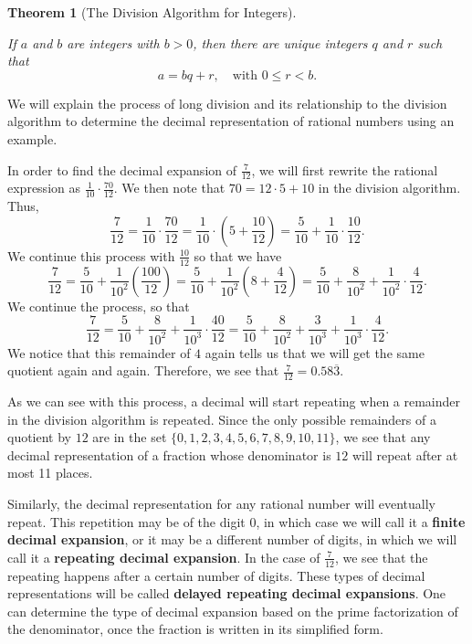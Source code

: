 \documentclass[
]{book}
\newtheorem{theorem}{Theorem}[chapter]
\theoremstyle{definition}
\theoremstyle{definition}
\theoremstyle{definition}
\theoremstyle{definition}
\theoremstyle{remark}
\begin{document}
\begin{theorem}[The Division Algorithm for Integers]
\protect\hypertarget{thm:unlabeled-div-45}{}\label{thm:unlabeled-div-45}

If \(a\) and \(b\) are integers with \(b>0\), then there are unique integers \(q\) and \(r\) such that \[a=bq+r, \quad \mbox{with } 0\leq r <b.\]

\end{theorem}

We will explain the process of long division and its relationship to the division algorithm to determine the decimal representation of rational numbers using an example.

In order to find the decimal expansion of \(\frac{7}{12}\), we will first rewrite the rational expression as \(\frac{1}{10} \cdot \frac{70}{12}\). We then note that \(70=12\cdot 5 + 10\) in the division algorithm. Thus,
\[\frac{7}{12} = \frac{1}{10} \cdot \frac{70}{12} = \frac{1}{10} \cdot \left( 5 + \frac{10}{12}\right)= \frac{5}{10} + \frac{1}{10} \cdot \frac{10}{12}.\] We continue this process with \(\frac{10}{12}\) so that we have \[\frac{7}{12}= \frac{5}{10} + \frac{1}{10^2} \left(\frac{100}{12}\right) = \frac{5}{10} + \frac{1}{10^2} \left(8 + \frac{4}{12}\right)= \frac{5}{10} + \frac{8}{10^2} + \frac{1}{10^2} \cdot \frac{4}{12}.\] We continue the process, so that \[\frac{7}{12} = \frac{5}{10} + \frac{8}{10^2} + \frac{1}{10^3} \cdot \frac{40}{12} = \frac{5}{10} + \frac{8}{10^2} + \frac{3}{10^3} + \frac{1}{10^3} \cdot \frac{4}{12}.\] We notice that this remainder of \(4\) again tells us that we will get the same quotient again and again. Therefore, we see that
\(\frac{7}{12} = 0.58\overline{3}\).

As we can see with this process, a decimal will start repeating when a remainder in the division algorithm is repeated. Since the only possible remainders of a quotient by \(12\) are in the set \(\{0,1,2,3,4,5,6,7,8,9,10,11\}\), we see that any decimal representation of a fraction whose denominator is \(12\) will repeat after at most 11 places.

Similarly, the decimal representation for any rational number will eventually repeat. This repetition may be of the digit \(0\), in which case we will call it a \textbf{finite decimal expansion}, or it may be a different number of digits, in which we will call it a \textbf{repeating decimal expansion}. In the case of \(\frac{7}{12}\), we see that the repeating happens after a certain number of digits. These types of decimal representations will be called \textbf{delayed repeating decimal expansions}. One can determine the type of decimal expansion based on the prime factorization of the denominator, once the fraction is written in its simplified form.
\end{document}
